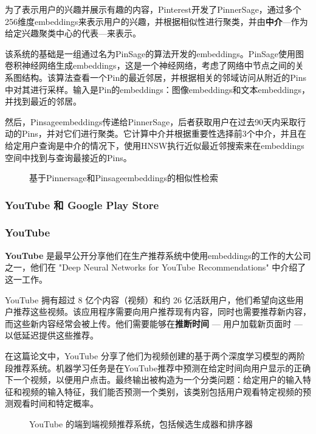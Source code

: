 \documentclass[Chinese, 11pt, table]{diazessay} %
\begin{document}
\begin{CJK}{UTF8}{gbsn}
\begin{sloppypar}
为了表示用户的兴趣并展示有趣的内容，Pinterest开发了PinnerSage\citep{pal2020pinnersage}，通过多个256维度embeddings来表示用户的兴趣，并根据相似性进行聚类，并由\textbf{中介}---作为给定兴趣聚类中心的代表---来表示。

该系统的基础是一组通过名为PinSage的算法\citep{ying2018graph}开发的embeddings。PinSage使用图卷积神经网络生成embeddings，这是一个神经网络，考虑了网络中节点之间的关系图结构。该算法查看一个Pin的最近邻居，并根据相关的邻域访问从附近的Pins中对其进行采样。输入是Pin的embeddings：图像embeddings和文本embeddings，并找到最近的邻居。

然后，Pinsageembeddings传递给PinnerSage，后者获取用户在过去90天内采取行动的Pins，并对它们进行聚类。它计算中介并根据重要性选择前3个中介，并且在给定用户查询是中介的情况下，使用HNSW执行近似最近邻搜索来在embeddings空间中找到与查询最接近的Pins。

\begin{figure}[H]
\caption{基于Pinnersage和Pinsageembeddings的相似性检索}
\end{figure}


\subsubsection{YouTube 和 Google Play Store}

\subsubsection*{YouTube}
\textbf{YouTube} 是最早公开分享他们在生产推荐系统中使用embeddings的工作的大公司之一，他们在 "Deep Neural Networks for YouTube Recommendations" 中介绍了这一工作。

YouTube 拥有超过 8 亿个内容（视频）和约 26 亿活跃用户，他们希望向这些用户推荐这些视频。该应用程序需要向用户推荐现有内容，同时也需要推荐新内容，而这些新内容经常会被上传。他们需要能够在\textbf{推断时间} --- 用户加载新页面时 --- 以低延迟提供这些推荐。

在这篇论文中\citep{covington2016deep}，YouTube 分享了他们为视频创建的基于两个深度学习模型的两阶段推荐系统。机器学习任务是在YouTube推荐中预测在给定时间向用户显示的正确下一个视频，以便用户点击。最终输出被构造为一个分类问题：给定用户的输入特征和视频的输入特征，我们能否预测一个类别，该类别包括用户观看特定视频的预测观看时间和特定概率。

\begin{figure}[H]
\caption{YouTube 的端到端视频推荐系统，包括候选生成器和排序器 \citep{covington2016deep}}
\end{figure}


\end{sloppypar}
\end{CJK}
\end{document}
